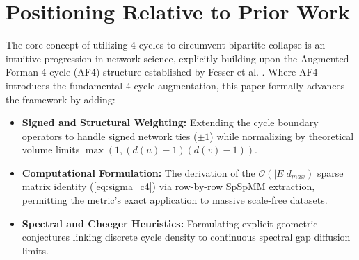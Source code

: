 \documentclass{siuro250211}
\theoremstyle{remark}
\theoremstyle{plain}
\begin{document}
\section{Positioning Relative to Prior Work}
The core concept of utilizing 4-cycles to circumvent bipartite collapse is an intuitive progression in network science, explicitly building upon the Augmented Forman 4-cycle (AF4) structure established by Fesser et al. \cite{fesser2024augmentations}. Where AF4 introduces the fundamental 4-cycle augmentation, this paper formally advances the framework by adding:
\begin{itemize}
    \item \textbf{Signed and Structural Weighting:} Extending the cycle boundary operators to handle signed network ties ($\pm 1$) while normalizing by theoretical volume limits $\max(1,(d(u)-1)(d(v)-1))$.
    \item \textbf{Computational Formulation:} The derivation of the $\mathcal{O}(|E|d_{max})$ sparse matrix identity (\cref{eq:sigma_c4}) via row-by-row SpSpMM extraction, permitting the metric's exact application to massive scale-free datasets.
    \item \textbf{Spectral and Cheeger Heuristics:} Formulating explicit geometric conjectures linking discrete cycle density to continuous spectral gap diffusion limits.
\end{itemize}
\end{document}
